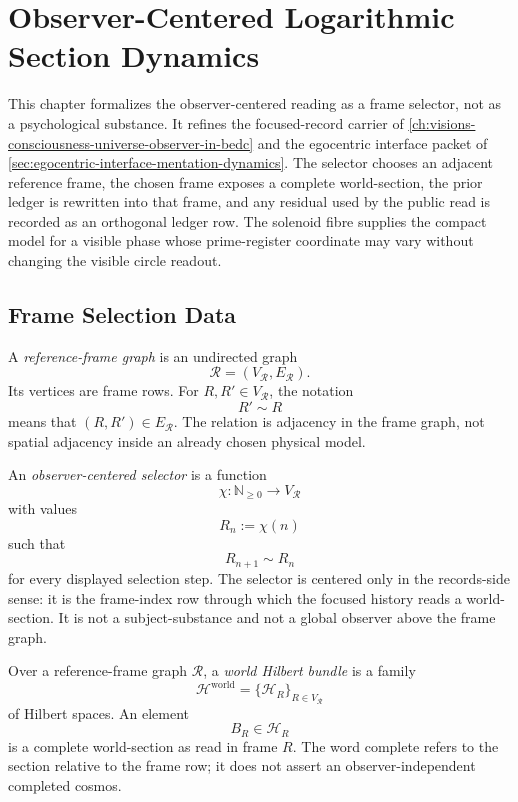 \chapter{Observer-Centered Logarithmic Section Dynamics}
\label{ch:visions-observer-centered-logarithmic-section-dynamics}

This chapter formalizes the observer-centered reading as a frame selector,
not as a psychological substance. It refines the focused-record carrier of
\autoref{ch:visions-consciousness-universe-observer-in-bedc} and the
egocentric interface packet of
\autoref{sec:egocentric-interface-mentation-dynamics}. The selector chooses
an adjacent reference frame, the chosen frame exposes a complete
world-section, the prior ledger is rewritten into that frame, and any
residual used by the public read is recorded as an orthogonal ledger row.
The solenoid fibre supplies the compact model for a visible phase whose
prime-register coordinate may vary without changing the visible circle
readout.

\section{Frame Selection Data}
\label{sec:observer-centered-frame-selection-data}

\begin{definition}
\label{def:observer-centered-reference-frame-graph}
A \emph{reference-frame graph} is an undirected graph
$$
\mathcal R=(V_{\mathcal R},E_{\mathcal R}).
$$
Its vertices are frame rows. For $R,R'\in V_{\mathcal R}$, the notation
$$
R'\sim R
$$
means that $(R,R')\in E_{\mathcal R}$. The relation is adjacency in the
frame graph, not spatial adjacency inside an already chosen physical
model.
\end{definition}

\begin{definition}
\label{def:observer-centered-selector}
An \emph{observer-centered selector} is a function
$$
\chi:\mathbb N_{\ge0}\to V_{\mathcal R}
$$
with values
$$
R_n:=\chi(n)
$$
such that
$$
R_{n+1}\sim R_n
$$
for every displayed selection step. The selector is centered only in the
records-side sense: it is the frame-index row through which the focused
history reads a world-section. It is not a subject-substance and not a
global observer above the frame graph.
\end{definition}

\begin{definition}
\label{def:observer-centered-world-hilbert-bundle}
Over a reference-frame graph $\mathcal R$, a \emph{world Hilbert bundle}
is a family
$$
\mathcal H^{\mathrm{world}}=\{\mathcal H_R\}_{R\in V_{\mathcal R}}
$$
of Hilbert spaces. An element
$$
B_R\in\mathcal H_R
$$
is a complete world-section as read in frame $R$. The word complete refers
to the section relative to the frame row; it does not assert an
observer-independent completed cosmos.
\end{definition}


